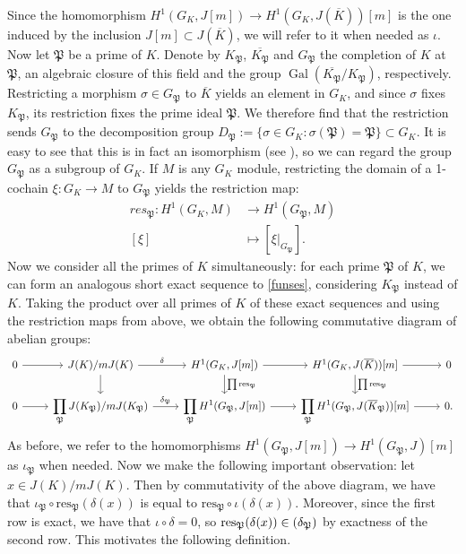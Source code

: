 \documentclass[a4paper, 12pt]{amsart}
\theoremstyle{definition}
\theoremstyle{plain}
\theoremstyle{plain}
\theoremstyle{plain}
\theoremstyle{plain}
\theoremstyle{remark}
\theoremstyle{remark}
\theoremstyle{plain}
\renewcommand{\P}{\mathfrak{P}}
\DeclareMathOperator{\Gal}{Gal}
\let\Im\relax
\DeclareMathOperator{\Im}{Im}
\begin{document}
Since the homomorphism $H^1(G_K,J[m])\rightarrow H^1(G_K,J(\overline{K}))[m]$ is the one induced by the inclusion $J[m]\subset J(\overline{K})$, we will refer to it when needed as $\iota$. Now let $\P$ be a prime of $K$. Denote by $K_\P$, $\overline{K_\P}$ and $G_\P$ the completion of $K$ at $\P$, an algebraic closure of this field and the group $\Gal(\overline{K_\P}/K_\P)$, respectively. Restricting a morphism $\sigma\in G_\P$ to $\overline{K}$ yields an element in $G_K$, and since $\sigma$ fixes $K_\P$, its restriction fixes the prime ideal $\P$. We therefore find that the restriction sends $G_\P$ to the decomposition group $D_\P:=\{\sigma\in G_K: \sigma(\P)=\P\}\subset G_K$. It is easy to see that this is in fact an isomorphism (see \cite{Janusz_1973}), so we can regard the group $G_\P$ as a subgroup of $G_K$. If $M$ is any $G_K$ module, restricting the domain of a 1-cochain $\xi:G_K\rightarrow M$ to $G_\P$ yields the restriction map:
\begin{align*}
	res_\P:H^1(G_K,M)&\rightarrow H^1(G_\P,M)\\
	[\xi]&\mapsto [\xi|_{G_\P}].
\end{align*}
Now we consider all the primes of $K$ simultaneously: for each prime $\P$ of $K$, we can form an analogous short exact sequence to \eqref{funses}, considering $K_\P$ instead of $K$. Taking the product over all primes of $K$ of these exact sequences and using the restriction maps from above, we obtain the following commutative diagram of abelian groups:
\small
	\begin{equation}\label{seldiag}
		\begin{tikzcd}
			0\arrow[r]
			&J(K)/mJ(K)\arrow{r}{\delta}\arrow{d}
			&H^1(G_K, J[m])\arrow{r}\arrow{d}{\prod\text{res}_\P}
			&H^1(G_K,J(\overline{K}))[m]\arrow{r}\arrow{d}{\prod\text{res}_\P}
			&0
			\\
			0\arrow[r]
			&\displaystyle \prod_\P J(K_\P)/mJ(K_\P)\arrow{r}{\delta_\P}
			&\displaystyle \prod_\P H^1(G_\P, J[m])\arrow{r}
			&\displaystyle \prod_\P H^1(G_\P,J(\overline{K}_\P))[m]\arrow{r}
			&0.
		\end{tikzcd}
	\end{equation}
\normalsize
	As before, we refer to the homomorphisms $H^1(G_\P,J[m])\rightarrow H^1(G_\P,J)[m]$ as $\iota_\P$ when needed. Now we make the following important observation: let $x\in J(K)/mJ(K)$. Then by commutativity of the above diagram, we have that $\iota_\P\circ\text{res}_\P(\delta(x))$ is equal to $\text{res}_\P\circ \iota(\delta(x))$. Moreover, since the first row is exact, we have that $\iota\circ\delta=0$, so $\text{res}_\P(\delta(x))\in \Im(\delta_\P)$ by exactness of the second row. This motivates the following definition.
\end{document}
